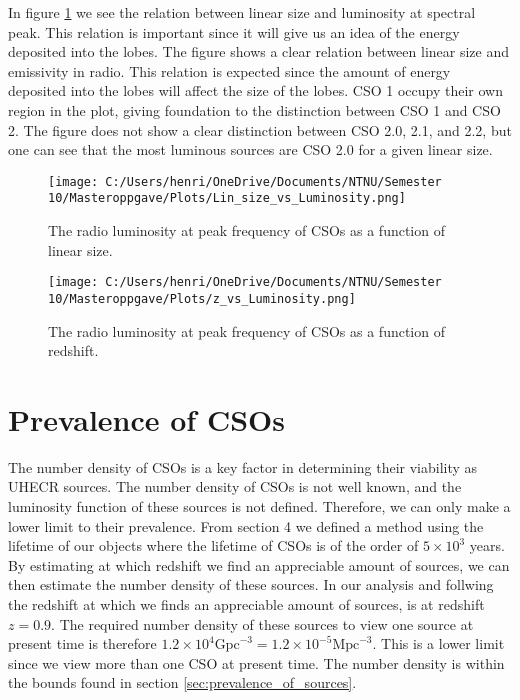 In figure \ref{fig:Luminosity_size} we see the relation between linear size and luminosity at spectral peak. This relation is important since it will give us an idea of the energy deposited into the lobes. The figure shows a clear relation between linear size and emissivity in radio. This relation is expected since the amount of energy deposited into the lobes will affect the size of the lobes. CSO 1 occupy their own region in the plot, giving foundation to the distinction between CSO 1 and CSO 2. The figure does not show a clear distinction between CSO 2.0, 2.1, and 2.2, but one can see that the most luminous sources are CSO 2.0 for a given linear size. 





\begin{figure}
    \centering
    \texttt{[image: C:/Users/henri/OneDrive/Documents/NTNU/Semester 10/Masteroppgave/Plots/Lin\_size\_vs\_Luminosity.png]}
    \caption{The radio luminosity at peak frequency of CSOs as a function of linear size.}
    \label{fig:Luminosity_size}
\end{figure}
\begin{figure}
    \centering
    \texttt{[image: C:/Users/henri/OneDrive/Documents/NTNU/Semester 10/Masteroppgave/Plots/z\_vs\_Luminosity.png]}
    \caption{The radio luminosity at peak frequency of CSOs as a function of redshift.}
    \label{fig:Luminosity_redshift}
\end{figure}

\section{Prevalence of CSOs}
\label{sec:prevalence}

The number density of CSOs is a key factor in determining their viability as UHECR sources. The number density of CSOs is not well known, and the luminosity function of these sources is not defined. Therefore, we can only make a lower limit to their prevalence. From section 4 we defined a method using the lifetime of our objects where the lifetime of CSOs is of the order of $5 \times 10^3$ years. By estimating at which redshift we find an appreciable amount of sources, we can then estimate the number density of these sources.
 In our analysis and follwing \cite{kiehlmann2023compact2} the redshift at which we finds an appreciable amount of sources, is at redshift $z=0.9$. The required number density of these sources to view one source at present time is therefore $1.2 \times 10^{4} \text{Gpc}^{-3} = 1.2 \times 10^{-5} \text{Mpc}^{-3}$. This is a lower limit since we view more than one CSO at present time. 
The number density is within the bounds found in section \ref{sec:prevalence_of_sources}. 

